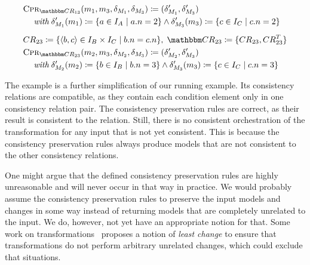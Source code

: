 \begin{align*}
    &
    \consistencypreservationrule{\consistencyrelationset{CR}_{13}}(\model{m}{1}, \model{m}{3}, \change{\metamodel{M}{1}}, \change{\metamodel{M}{3}}) \equalsperdefinition (\change{\metamodel{M}{1}}', \change{\metamodel{M}{3}}') \\
    & \formulaskip
        \withmath \change{\metamodel{M}{1}}'(\model{m}{1}) \equalsperdefinition \setted{a \in \instances{\class{A}{}} \mid a.n = 2} \land \change{\metamodel{M}{3}}'(\model{m}{3}) \equalsperdefinition \setted{c \in \instances{\class{C}{}} \mid c.n = 2} \\[0.5em]
    &
    \consistencyrelation{CR}{23} \equalsperdefinition \setted{\tupled{b,c} \in \instances{\class{B}{}} \times \instances{\class{C}{}} \mid b.n = c.n}, \;
    \consistencyrelationset{CR}_{23} \equalsperdefinition \setted{\consistencyrelation{CR}{23}, \consistencyrelation{CR}{23}^T} \\
    &
    \consistencypreservationrule{\consistencyrelationset{CR}_{23}}(\model{m}{2}, \model{m}{3}, \change{\metamodel{M}{2}}, \change{\metamodel{M}{3}}) \equalsperdefinition (\change{\metamodel{M}{2}}', \change{\metamodel{M}{3}}') \\
    & \formulaskip
        \withmath \change{\metamodel{M}{2}}'(\model{m}{2}) \equalsperdefinition \setted{b \in \instances{\class{B}{}} \mid b.n = 3} \land \change{\metamodel{M}{3}}'(\model{m}{3}) \equalsperdefinition \setted{c \in \instances{\class{C}{}} \mid c.n = 3}
\end{align*}

The example is a further simplification of our running example.
Its consistency relations are compatible, as they contain each condition element only in one consistency relation pair.
The consistency preservation rules are correct, as their result is consistent to the relation.
Still, there is no consistent orchestration of the transformation for any input that is not yet consistent.
This is because the consistency preservation rules always produce models that are not consistent to the other consistency relations.

One might argue that the defined consistency preservation rules are highly unreasonable and will never occur in that way in practice.
We would probably assume the consistency preservation rules to preserve the input models and changes in some way instead of returning models that are completely unrelated to the input.
We do, however, not yet have an appropriate notion for that.
Some work on transformations~\cite{cheney2017LeastChangeBx-JOT,macedo2016qvtAtlAlloy-SoSym} proposes a notion of \emph{least change} to ensure that transformations do not perform arbitrary unrelated changes, which could exclude that situations.

